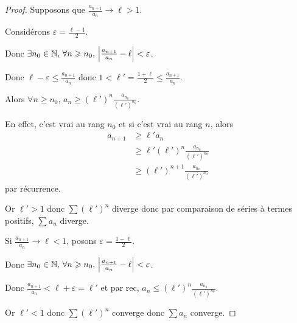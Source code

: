 \begin{proof}
    Supposons que $\frac{a_{n + 1 }}{a_n } \longrightarrow \ell > 1$. 

    Considérons $\varepsilon = \frac{\ell - 1 }{2 }$.

    Donc $\exists n_0 \in \mathbb{N}, \, \forall n \geqslant n_0, \, \left|\frac{a_{n + 1}}{a_n} - \ell\right| < \varepsilon$.

    Donc $\ell - \varepsilon \leqslant \frac{a_{n + 1}}{a_n} $ donc $1 < \ell' = \frac{1 + \ell  }{2} \leqslant \frac{a_{n + 1}}{a_n}$.

    Alors $\displaystyle \forall n \geqslant n_0$, $\displaystyle a_n \geqslant (\ell')^n \frac{a_{n_0}}{(\ell')^{n_0}}$.

    En effet, c'est vrai au rang $n_0$ et si c'est vrai au rang $n$, 
    alors 
    \begin{align*}
        a_{n + 1} & \geqslant \ell' a_n \\
                  & \geqslant \ell' (\ell')^n \frac{a_{n_0}}{(\ell')^{n_0}} \\
                  & \geqslant (\ell')^{n + 1} \frac{a_{n_0}}{(\ell')^{n_0}}
    \end{align*} par récurrence. 


    Or $\ell' > 1$ donc $\sum (\ell')^n$ diverge donc par comparaison de séries à termes positifs, 
    $\sum a_n$ diverge.

    Si $\frac{a_{n + 1}}{a_n} \longrightarrow \ell < 1$, posons $\varepsilon = \frac{1 - \ell}{2}$.

    Donc $\exists n_0 \in \mathbb{N}, \, \forall n \geqslant n_0, \, \left|\frac{a_{n + 1}}{a_n} - \ell\right| < \varepsilon$.

    Donc $\frac{a_{n + 1}}{a_n} < \ell + \varepsilon = \ell'$ et par rec, $a_n \leqslant (\ell')^{n} \frac{a_{n_0}}{(\ell')^{n_0}}$.

    Or $\ell' < 1$ donc $\sum (\ell')^n$ converge donc $\sum a_n$ converge. 

\end{proof}


